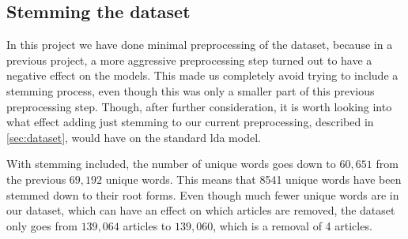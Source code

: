 \subsection{Stemming the dataset}\label{sec:stemming}
In this project we have done minimal preprocessing of the dataset, because in a previous project, a more aggressive preprocessing step turned out to have a negative effect on the models.
This made us completely avoid trying to include a stemming process, even though this was only a smaller part of this previous preprocessing step.
Though, after further consideration, it is worth looking into what effect adding just stemming to our current preprocessing, described in \autoref{sec:dataset}, would have on the standard \gls{lda} model.

With stemming included, the number of unique words goes down to $60,651$ from the previous $69,192$ unique words.
This means that 8541 unique words have been stemmed down to their root forms.
Even though much fewer unique words are in our dataset, which can have an effect on which articles are removed, the dataset only goes from $139,064$ articles to $139,060$, which is a removal of 4 articles.

